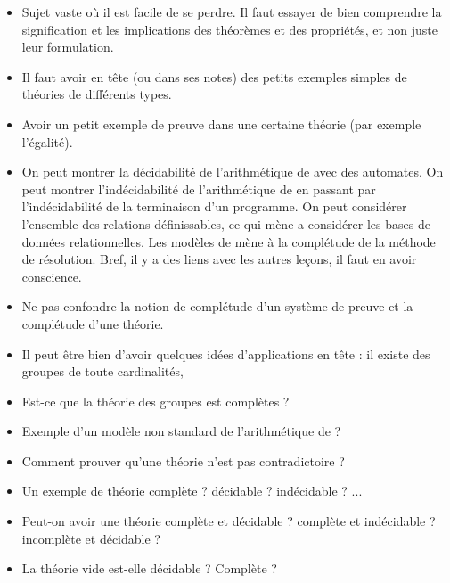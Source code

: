 \documentclass{agregfiche}
\begin{document}
\secpieges

\begin{itemize}
	\item Sujet vaste où il est facile de se perdre. Il faut essayer 
	de bien comprendre la signification et les implications des 
	théorèmes et des propriétés, et non juste leur formulation.
    \item Il faut avoir en tête (ou dans ses notes) des petits 
    exemples simples de théories de différents types.
    \item Avoir un petit exemple de preuve dans une certaine théorie 
    (par exemple l'égalité).
    \item On peut montrer la décidabilité de l'arithmétique de 
     avec des automates. On peut montrer 
    l'indécidabilité 
    de l'arithmétique de  en passant par l'indécidabilité 
    de la 
    terminaison d'un programme. On peut considérer l'ensemble des 
    relations définissables, ce qui mène a considérer les bases de 
    données relationnelles. Les modèles de  mène à la 
    complétude de la méthode de résolution. Bref, il y a des liens 
    avec les autres 
    leçons, il faut en avoir conscience.
    \item Ne pas confondre la notion de complétude d'un système de 
    preuve et la complétude d'une théorie.
    \item Il peut être bien d'avoir quelques idées d'applications en 
    tête : il existe des groupes de toute cardinalités,
\end{itemize}

\secquestionsclassiques

\begin{itemize}
	\item Est-ce que la théorie des groupes est complètes ?
    \item Exemple d'un modèle non standard de l'arithmétique de 
    ?
    \item Comment prouver qu'une théorie n'est pas contradictoire ?
    \item Un exemple de théorie complète ? décidable ? indécidable ? 
    ...
    \item Peut-on avoir une théorie complète et décidable ? complète 
    et indécidable ? incomplète et décidable ?
    \item La théorie vide est-elle décidable ? Complète ?
\end{itemize}
\end{document}
